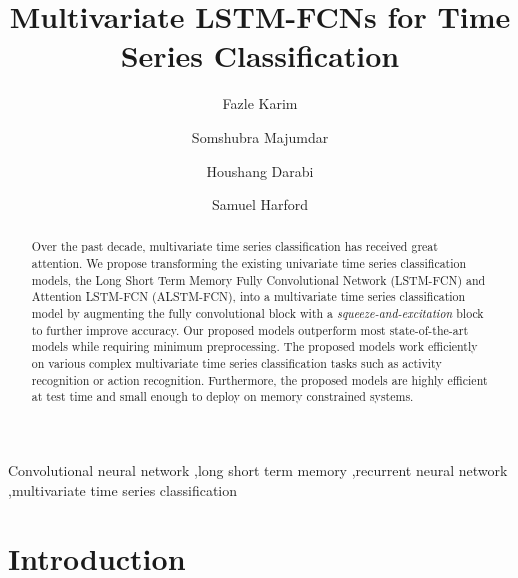\documentclass[preprint,12pt,3p]{elsarticle}
\begin{document}
\begin{frontmatter}

\title{Multivariate LSTM-FCNs for Time Series Classification}


\author[label1]{Fazle Karim }
\address[label1]{Mechanical and Industrial Engineering, University of Illinois at Chicago, 900 W. Taylor St., Chicago, IL, 60607, USA}
\address[label2]{Computer Science, University of Illinois at Chicago, 900 W. Taylor St., Chicago, IL, 60607, USA}





\author[label2]{Somshubra Majumdar}
\author[label1]{Houshang Darabi}

\author[label1]{Samuel Harford}



\begin{abstract}


Over the past decade, multivariate time series classification has received great attention. We propose transforming the existing univariate time series classification models, the Long Short Term Memory Fully Convolutional Network (LSTM-FCN) and Attention LSTM-FCN (ALSTM-FCN), into a multivariate time series classification model by augmenting the fully convolutional block with a \textit{squeeze-and-excitation} block to further improve accuracy. Our proposed models outperform most state-of-the-art models while requiring minimum preprocessing. The proposed models work efficiently on various complex multivariate time series classification tasks such as activity recognition or action recognition. Furthermore, the proposed models are highly efficient at test time and small enough to deploy on memory constrained systems. 

%
 \end{abstract}

\begin{keyword}
Convolutional neural network \sep long short term memory \sep recurrent neural network \sep multivariate time series classification
 
\end{keyword}

\end{frontmatter}

\section{Introduction}
\end{document}
